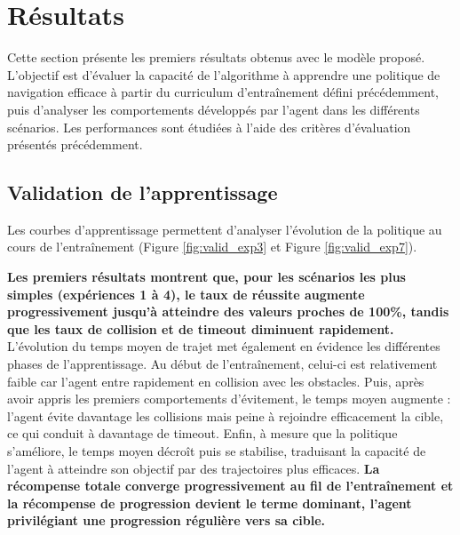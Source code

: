 \section{Résultats}

\begin{tcolorbox}[colback=black!5,colframe=black,title=]
    Cette section présente les premiers résultats obtenus avec le modèle proposé. L'objectif est d'évaluer la capacité de l'algorithme à apprendre une politique de navigation efficace à partir du curriculum d'entraînement défini précédemment, puis d'analyser les comportements développés par l'agent dans les différents scénarios. Les performances sont étudiées à l'aide des critères d'évaluation présentés précédemment.
\end{tcolorbox}



\subsection{Validation de l'apprentissage}

\noindent Les courbes d'apprentissage permettent d'analyser l'évolution de la politique au cours de l'entraînement (Figure \ref{fig:valid_exp3} et Figure \ref{fig:valid_exp7}).

\vspace{10pt}

\noindent \textbf{Les premiers résultats montrent que, pour les scénarios les plus simples (expériences 1 à 4), le taux de réussite augmente progressivement jusqu'à atteindre des valeurs proches de 100\%, tandis que les taux de collision et de timeout diminuent rapidement.} L'évolution du temps moyen de trajet met également en évidence les différentes phases de l'apprentissage. Au début de l'entraînement, celui-ci est relativement faible car l'agent entre rapidement en collision avec les obstacles. Puis, après avoir appris les premiers comportements d'évitement, le temps moyen augmente : l'agent évite davantage les collisions mais peine à rejoindre efficacement la cible, ce qui conduit à davantage de timeout. Enfin, à mesure que la politique s'améliore, le temps moyen décroît puis se stabilise, traduisant la capacité de l'agent à atteindre son objectif par des trajectoires plus efficaces. \textbf{La récompense totale converge progressivement au fil de l'entraînement et la récompense de progression devient le terme dominant, l'agent privilégiant une progression régulière vers sa cible.}

